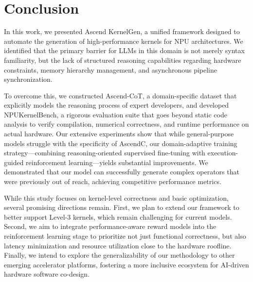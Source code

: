 \section{Conclusion}
\label{conclusions}

In this work, we presented Ascend KernelGen, a unified framework designed to automate the generation of high-performance kernels for NPU architectures. We identified that the primary barrier for LLMs in this domain is not merely syntax familiarity, but the lack of structured reasoning capabilities regarding hardware constraints, memory hierarchy management, and asynchronous pipeline synchronization.

To overcome this, we constructed Ascend-CoT, a domain-specific dataset that explicitly models the reasoning process of expert developers, and developed NPUKernelBench, a rigorous evaluation suite that goes beyond static code analysis to verify compilation, numerical correctness, and runtime performance on actual hardware. Our extensive experiments show that while general-purpose models struggle with the specificity of AscendC, our domain-adaptive training strategy—combining reasoning-oriented supervised fine-tuning with execution-guided reinforcement learning—yields substantial improvements. We demonstrated that our model can successfully generate complex operators that were previously out of reach, achieving competitive performance metrics.

While this study focuses on kernel-level correctness and basic optimization, several promising directions remain. First, we plan to extend our framework to better support Level-3 kernels, which remain challenging for current models. Second, we aim to integrate performance-aware reward models into the reinforcement learning stage to prioritize not just functional correctness, but also latency minimization and resource utilization close to the hardware roofline. Finally, we intend to explore the generalizability of our methodology to other emerging accelerator platforms, fostering a more inclusive ecosystem for AI-driven hardware software co-design.